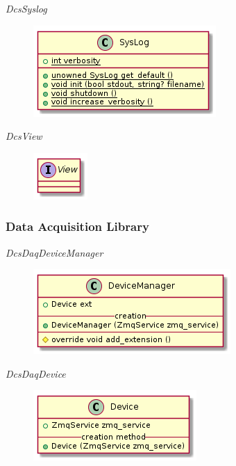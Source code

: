       \emph{DcsSyslog}

        \begin{figure}[H]
          \includegraphics{figures/design/class/core/syslog}
        \end{figure}

      \emph{DcsView}

        \begin{figure}[H]
          \includegraphics{figures/design/class/core/view}
        \end{figure}

    \subsubsection{Data Acquisition Library}\label{sec:dsg-classes-daq}

      \emph{DcsDaqDeviceManager}

        \begin{figure}[H]
          \includegraphics{figures/design/class/daq/device-manager}
        \end{figure}

      \emph{DcsDaqDevice}

        \begin{figure}[H]
          \includegraphics{figures/design/class/daq/device}
        \end{figure}

